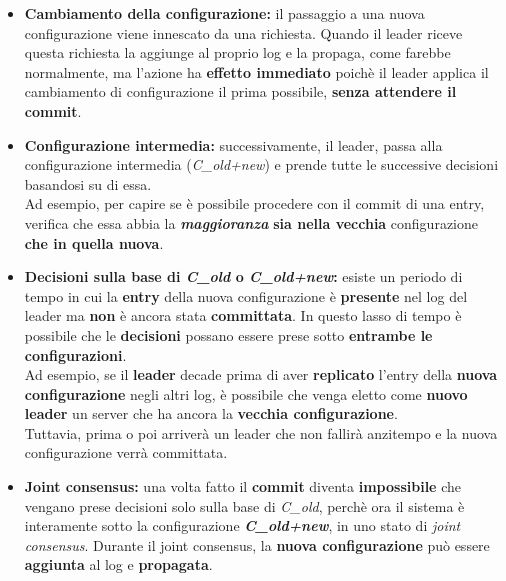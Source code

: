     \begin{itemize}
      \item{\textbf{Cambiamento della configurazione:} il passaggio a una nuova configurazione viene innescato da una richiesta. Quando il leader riceve questa richiesta la aggiunge al proprio log e la propaga, come farebbe normalmente, ma l'azione ha \textbf{effetto immediato} poichè il leader applica il cambiamento di configurazione il prima possibile, \textbf{senza attendere il commit}.}

      \item{\textbf{Configurazione intermedia:} successivamente, il leader, passa alla configurazione intermedia (\textit{C\_old+new}) e prende tutte le successive decisioni basandosi su di essa.\\
      Ad esempio, per capire se è possibile procedere con il commit di una entry, verifica che essa abbia la \textbf{\textit{maggioranza}} \textbf{sia nella vecchia} configurazione \textbf{che in quella nuova}.} 

      \item{\textbf{Decisioni sulla base di \textit{C\_old} o \textit{C\_old+new}:} esiste un periodo di tempo in cui la \textbf{entry} della nuova configurazione è \textbf{presente} nel log del leader ma \textbf{non} è ancora stata \textbf{committata}. In questo lasso di tempo è possibile che le \textbf{decisioni} possano essere prese sotto \textbf{entrambe le configurazioni}.\\
      Ad esempio, se il \textbf{leader} decade prima di aver \textbf{replicato} l'entry della \textbf{nuova configurazione} negli altri log, è possibile che venga eletto come \textbf{nuovo leader} un server che ha ancora la \textbf{vecchia configurazione}.\\
      Tuttavia, prima o poi arriverà un leader che non fallirà anzitempo e la nuova configurazione verrà committata. } 

      \item{\textbf{Joint consensus:} una volta fatto il \textbf{commit} diventa \textbf{impossibile} che vengano prese decisioni solo sulla base di \textit{C\_old}, perchè ora il sistema è interamente sotto la configurazione \textit{\textbf{C\_old+new}}, in uno stato di \textit{joint consensus}.
      Durante il joint consensus, la \textbf{nuova configurazione} può essere \textbf{aggiunta} al log e \textbf{propagata}.} 



\end{itemize}
